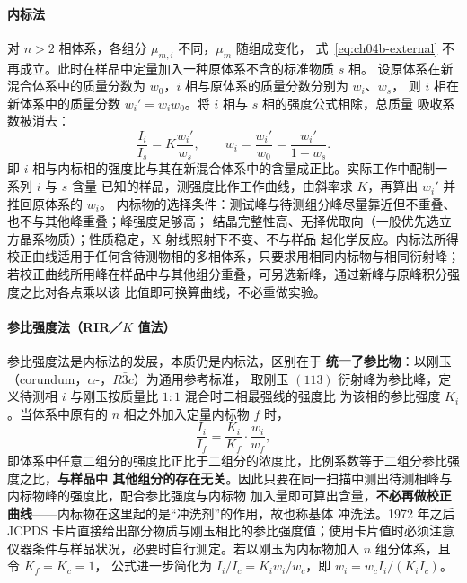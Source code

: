 \paragraph{内标法}对 $n>2$ 相体系，各组分 $\mu_{m,i}$ 不同，$\mu_{m}$ 随组成变化，
式~\eqref{eq:ch04b-external} 不再成立。此时在样品中定量加入一种原体系不含的标准物质 $s$ 相。
设原体系在新混合体系中的质量分数为 $w_{0}$，$i$ 相与原体系的质量分数分别为 $w_{i}$、$w_{s}$，
则 $i$ 相在新体系中的质量分数 $w_{i}'=w_{i}w_{0}$。将 $i$ 相与 $s$ 相的强度公式相除，总质量
吸收系数被消去：
\begin{equation}
\frac{I_{i}}{I_{s}}=K\frac{w_{i}'}{w_{s}},\qquad w_{i}=\frac{w_{i}'}{w_{0}}=\frac{w_{i}'}{1-w_{s}} .
\label{eq:ch04b-internal}
\end{equation}
即 $i$ 相与内标相的强度比与其在新混合体系中的含量成正比。实际工作中配制一系列 $i$ 与 $s$ 含量
已知的样品，测强度比作工作曲线，由斜率求 $K$，再算出 $w_{i}'$ 并推回原体系的 $w_{i}$。
内标物的选择条件：测试峰与待测组分峰尽量靠近但不重叠、也不与其他峰重叠；峰强度足够高；
结晶完整性高、无择优取向（一般优先选立方晶系物质）；性质稳定，X 射线照射下不变、不与样品
起化学反应。内标法所得校正曲线适用于任何含待测物相的多相体系，只要求用相同内标物与相同衍射峰；
若校正曲线所用峰在样品中与其他组分重叠，可另选新峰，通过新峰与原峰积分强度之比对各点乘以该
比值即可换算曲线，不必重做实验。

\paragraph{参比强度法（RIR／$K$ 值法）}参比强度法是内标法的发展，本质仍是内标法，区别在于
\textbf{统一了参比物}：以刚玉（corundum，$\alpha$-，$R\bar{3}c$）为通用参考标准，
取刚玉 $(113)$ 衍射峰为参比峰，定义待测相 $i$ 与刚玉按质量比 $1:1$ 混合时二相最强线的强度比
为该相的参比强度 $K_{i}$。当体系中原有的 $n$ 相之外加入定量内标物 $f$ 时，
\begin{equation}
\frac{I_{i}}{I_{f}}=\frac{K_{i}}{K_{f}}\cdot\frac{w_{i}}{w_{f}},
\label{eq:ch04b-RIR}
\end{equation}
即体系中任意二组分的强度比正比于二组分的浓度比，比例系数等于二组分参比强度之比，\textbf{与样品中
其他组分的存在无关}。因此只要在同一扫描中测出待测相峰与内标物峰的强度比，配合参比强度与内标物
加入量即可算出含量，\textbf{不必再做校正曲线}——内标物在这里起的是“冲洗剂”的作用，故也称基体
冲洗法。1972 年之后 JCPDS 卡片直接给出部分物质与刚玉相比的参比强度值；使用卡片值时必须注意
仪器条件与样品状况，必要时自行测定。若以刚玉为内标物加入 $n$ 组分体系，且令 $K_{f}=K_{c}=1$，
公式进一步简化为 $I_{i}/I_{c}=K_{i}w_{i}/w_{c}$，即 $w_{i}=w_{c}I_{i}/(K_{i}I_{c})$。

